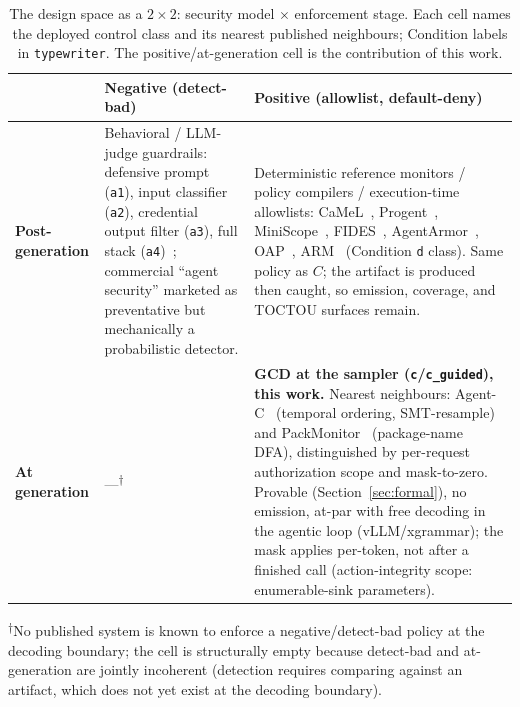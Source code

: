 \begin{table}[t]
\centering
\small
\caption{The design space as a \(2\times2\): security model \(\times\) enforcement stage. Each cell names the deployed control class and its nearest published neighbours; Condition labels in \texttt{typewriter}. The positive/at-generation cell is the contribution of this work.}
\label{tab:related-2x2}
\begin{tabular}{@{}p{} p{} p{}@{}}
\toprule
 & \textbf{Negative} (detect-bad) & \textbf{Positive} (allowlist, default-deny) \\
\midrule
\textbf{Post-generation} & Behavioral / LLM-judge guardrails: defensive prompt (\texttt{a1}), input classifier (\texttt{a2}), credential output filter (\texttt{a3}), full stack (\texttt{a4})~\cite{greshake2023,zhang2024asb}; commercial ``agent security'' marketed as preventative but mechanically a probabilistic detector. & Deterministic reference monitors / policy compilers / execution-time allowlists: CaMeL~\cite{camel2025}, Progent~\cite{progent2025}, MiniScope~\cite{miniscope2025}, FIDES~\cite{fides2025}, AgentArmor~\cite{agentarmor2025}, OAP~\cite{oap2026}, ARM~\cite{arm2026} (Condition \texttt{d} class). Same policy as \(C\); the artifact is produced then caught, so emission, coverage, and TOCTOU surfaces remain. \\
\addlinespace
\textbf{At generation} & ---\textsuperscript{$\dagger$} & \textbf{GCD at the sampler (\texttt{c}/\texttt{c\_guided}), this work.} Nearest neighbours: Agent-C~\cite{agentc2025} (temporal ordering, SMT-resample) and PackMonitor~\cite{packmonitor2026} (package-name DFA), distinguished by per-request authorization scope and mask-to-zero. Provable (Section~\ref{sec:formal}), no emission, at-par with free decoding in the agentic loop (vLLM/xgrammar); the mask applies per-token, not after a finished call (action-integrity scope: enumerable-sink parameters). \\
\bottomrule
\end{tabular}

\vspace{2pt}
{\footnotesize \textsuperscript{$\dagger$}No published system is known to enforce a negative/detect-bad policy at the decoding boundary; the cell is structurally empty because detect-bad and at-generation are jointly incoherent (detection requires comparing against an artifact, which does not yet exist at the decoding boundary).}
\end{table}

